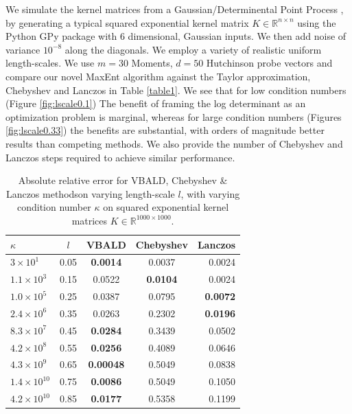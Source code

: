 \documentclass[letterpaper]{article} %
\begin{document}
We simulate the kernel matrices from a Gaussian/Determinental Point Process \cite{Rasmussen2006}, by generating a typical squared exponential kernel matrix $K \in \mathbb{R}^{n \times n}$ using the Python GPy package with $6$ dimensional, Gaussian inputs. We then add noise of variance $10^{-8}$ along the diagonals. We employ a variety of realistic uniform length-scales. We use $m=30$ Moments, $d=50$ Hutchinson probe vectors and compare our novel MaxEnt algorithm against the Taylor approximation, Chebyshev \cite{han2015large} and Lanczos \cite{ubaru2017fast} in Table \ref{table1}. We see that for low condition numbers (Figure \ref{fig:lscale0.1}) The benefit of framing the log determinant as an optimization problem is marginal, whereas for large condition numbers (Figures \ref{fig:lscale0.33}) the benefits are substantial, with orders of magnitude better results than competing methods. We also provide the number of Chebyshev and Lanczos steps required to achieve similar performance. 
\begin{table}[t]
	\label{table1}
	\caption{Absolute relative error for VBALD, Chebyshev \& Lanczos methodson varying length-scale $l$, with varying condition number $\kappa$ on squared exponential kernel matrices $K \in \mathbb{R}^{1000\times 1000}$.}
	\label{sample-table}
	\vskip 0.15in
	\begin{center}
		\begin{small}
			\begin{sc}
				\begin{tabular}{lcccr}
					\toprule
					$\kappa$ & $l$ & VBALD & Chebyshev & Lanczos \\
					\midrule
					$3\times10^{1}$    & 0.05& \bf{0.0014}& 0.0037 & 0.0024 \\
					$1.1\times10^{3}$ & 0.15& 0.0522& \bf{0.0104} & 0.0024\\
					$1.0\times10^{5}$    & 0.25& 0.0387& 0.0795 & \bf{0.0072} \\
					$2.4\times10^{6}$    & 0.35& 0.0263& 0.2302    & \bf{0.0196}    \\
					$8.3\times10^{7}$     & 0.45& \bf{0.0284}& 0.3439 & 0.0502\\
					$4.2\times10^{8}$     & 0.55&
					\bf{0.0256}& 0.4089 & 0.0646\\
					$4.3\times10^{9}$     & 0.65&
					\bf{0.00048}& 0.5049 & 0.0838\\
					$1.4\times10^{10}$     & 0.75& \bf{0.0086}& 0.5049  &0.1050       \\
					$4.2\times10^{10}$   & 0.85& \bf{0.0177}& 0.5358 &0.1199\\
					\bottomrule
				\end{tabular}
			\end{sc}
		\end{small}
	\end{center}
	\vskip -0.1in
\end{table}
\end{document}
